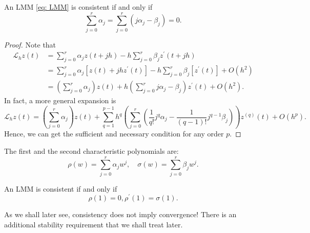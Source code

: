  
 \begin{theorem}
 \label{thm: Consistency of LMM}
An LMM \eqref{eq: LMM} is consistent if and only if
$$
\sum_{j=0}^r \alpha_j=\sum_{j=0}^r\left(j \alpha_j-\beta_j\right)=0 .
$$
 \end{theorem}
 \begin{proof}
 Note that 
 \[
    \begin{aligned}
        \mathscr{L}_h z(t) & =\sum_{j=0}^r \alpha_j z(t+j h)-h \sum_{j=0}^r \beta_j z^{\prime}(t+j h) \\
        & =\sum_{j=0}^r \alpha_j\left[z(t)+j h z^{\prime}(t)\right]-h \sum_{j=0}^r \beta_j\left[z^{\prime}(t)\right]+O\left(h^2\right) \\
        & =\left(\sum_{j=0}^r \alpha_j\right) z(t)+h\left(\sum_{j=0}^r j \alpha_j-\beta_j\right) z^{\prime}(t)+O\left(h^2\right).
        \end{aligned}
 \]
 In fact, a more general expansion is
 \[
    \mathscr{L}_h z(t) =\left(\sum_{j=0}^r \alpha_j\right) z(t)+ \sum_{q=1}^{p-1} h^{q} \left( \sum_{j=0}^r \left( \frac{1}{q!}j^{q}\alpha _j - \frac{1}{(q-1)!}j^{q-1}\beta _{j} \right) \right) z^{(q)}(t) + O(h^{p}).
 \]
 Hence, we can get the sufficient and necessary condition for any order $ p $. 
 \end{proof}

 
 \begin{definition}
 \label{def: first and second characteristic polynomials of LMM}
 The first and the second characteristic polynomials are: 
 \[
    \rho(w)=\sum_{j=0}^r \alpha_j w^j, \quad \sigma(w)=\sum_{j=0}^r \beta_j w^j .
 \]

 \end{definition}
 
 
 \begin{corollary}
 \label{cor: characteristic poly LMM consistency}
 An LMM is consistent if and only if 
 \[
    \rho (1) = 0, \rho ^\prime (1) = \sigma (1). 
 \]
 \end{corollary}
 As we shall later see, consistency does not imply convergence! There is an additional stability requirement that we shall treat later.
 
